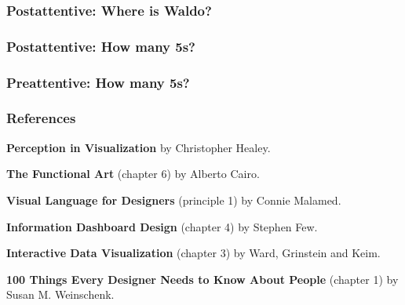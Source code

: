 \documentclass[12pt]{beamer}\usepackage[]{graphicx}\usepackage[]{color}
\begin{document}
\begin{frame}
\frametitle{Postattentive: Where is Waldo?}
\begin{center}
\end{center}
\end{frame}


\begin{frame}
\frametitle{Postattentive: How many 5s?}
\begin{center}
\end{center}
\end{frame}


\begin{frame}
\frametitle{Preattentive: How many 5s?}
\begin{center}
\end{center}
\end{frame}


\begin{frame}
\frametitle{References}

\bbi
  \item \textbf{Perception in Visualization} by Christopher Healey.
  \item \textbf{The Functional Art} (chapter 6) by Alberto Cairo.
  \item \textbf{Visual Language for Designers} (principle 1) by Connie Malamed.
  \item \textbf{Information Dashboard Design} (chapter 4) by Stephen Few.
  \item \textbf{Interactive Data Visualization} (chapter 3) by Ward, Grinstein
  and Keim.
  \item \textbf{100 Things Every Designer Needs to Know About People} 
  (chapter 1) by Susan M. Weinschenk.
\ei

\end{frame}

\end{document}
